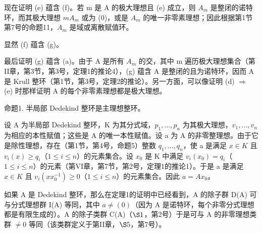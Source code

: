 现在证明 (e) 蕴含 (f)。若 m 是 A 的极大理想且 (e) 成立，则 \(A_{m}\) 是整闭的诺特环，而其极大理想 \(mA_{m}\) 或为 (0)，或是 \(A_{m}\) 的唯一非零素理想；因此根据第1节第7号的命题11，\(A_{m}\) 是域或离散赋值环。

显然 (f) 蕴含 (g)。

最后证明 (g) 蕴含 (a)。由于 A 是所有 \(A_{m}\) 的交，其中 m 遍历极大理想集合（第II章，第3节，第3号，定理1的推论4），(g) 蕴含 A 是整闭的且为诺特环，因而 A 是 Krull 整环（第1节，第3号，定理2的推论）。另一方面，可以像证明 (d) \(\Rightarrow\) (e) 时那样证明 A 的每个非零素理想都是极大理想。

命题1. 半局部 Dedekind 整环是主理想整环。

设 A 为半局部 Dedekind 整环，K 为其分式域，\(p_{1}, \ldots, p_{n}\) 为其极大理想，\(v_{1}, \ldots, v_{n}\) 为相应的本性赋值；这些是 A 的唯一本性赋值。设 a 为 A 的非零整理想。由于它是除性理想，存在（第1节，第4号，命题5）整数 \(q_{1}, \ldots, q_{n}\)，使 a 是满足 \(x \in K\) 且 \(v_{i}(x) \geqslant q_{i}\)（\(1 \leqslant i \leqslant n\)）的元素集合。设 \(x_{0}\) 是 K 中满足 \(v_{i}(x_{0}) = q_{i}\)（\(1 \leqslant i \leqslant n\)）的元素（第VI章，第7节，第2号，定理1的推论1）。于是 a 是满足 \(x \in K\) 且 \(v_{i}(xx_{0}^{-1}) \geqslant 0\)（\(1 \leqslant i \leqslant n\)）的元素集合。因此 \(a = Ax_{0}\)。

如果 A 是 Dedekind 整环，那么在定理1的证明中已经看到，A 的除子群 D(A) 可与分式理想群 I(A) 等同，其中 \(a \neq (0)\)（因为 A 是诺特环，每个非零分式理想都是有限生成的）。A 的除子类群 C(A)（\(\S 1\)，第2号）于是可与 A 的非零理想类群 \(\neq 0\) 等同（该类群定义于第II章，\(\S 5\)，第7号）。

